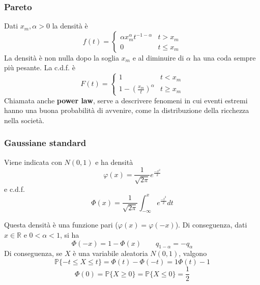 \subsubsection{Pareto}
Dati $x_m, \alpha > 0$ la densità è
\begin{equation}
	f(t) = \begin{cases}
		\alpha x_m^\alpha t^{-1-\alpha} & t> x_m \\
		0 & t \leq x_m
	\end{cases}
\end{equation}
La densità è non nulla dopo la soglia $x_m$ e al diminuire di $\alpha$ ha una coda sempre più pesante. La c.d.f. è
\begin{equation}
	F(t) = \begin{cases}
		1 & t < x_m \\
		1-(\frac{x_m}{t})^\alpha & t \geq x_m
	\end{cases}
\end{equation}
Chiamata anche \textbf{power law}, serve a descrivere fenomeni in cui eventi estremi hanno una buona probabilità di avvenire, come la distribuzione della ricchezza nella società.

\subsubsection{Gaussiane standard}
Viene indicata con $N(0,1)$ e ha densità
\begin{equation}
	\varphi(x) = \frac{1}{\sqrt{2\pi}}e^{\frac{-x^2}{2}}
\end{equation}
e c.d.f.
\begin{equation}
	\Phi(x)=\frac{1}{\sqrt{2\pi}}\int_{-\infty}^{x}e^{\frac{-t^2}{2}}dt
\end{equation}

\begin{observation}
	Questa densità è una funzione pari ($\varphi(x) = \varphi(-x)$). Di conseguenza, dati $x \in \mathbb{R}$ e $0 < \alpha < 1$, si ha
	\begin{equation}
		\Phi(-x) = 1 - \Phi(x) \quad\quad q_{1-\alpha} = -q_\alpha
	\end{equation}
	Di conseguenza, se $X$ è una variabile aleatoria $N(0,1)$, valgono
	\begin{equation}
		\mathbb{P}\{-t \leq X \leq t\} = \Phi(t) - \Phi(-t) = 1\Phi(t) -1
	\end{equation}
	\begin{equation}
		\Phi(0) = \mathbb{P}\{X \geq 0\} = \mathbb{P}\{X \leq 0\} = \frac{1}{2}
	\end{equation}
\end{observation}
